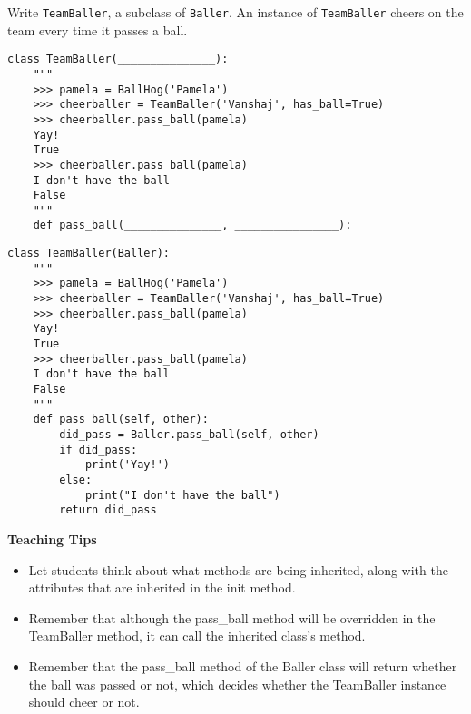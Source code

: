 \begin{blocksection}
\question Write \lstinline$TeamBaller$, a subclass of \lstinline$Baller$. An instance of \lstinline$TeamBaller$ cheers on the team every time it passes a ball.

\ifprintanswers\else
\begin{lstlisting}
class TeamBaller(_______________):
    """
    >>> pamela = BallHog('Pamela')
    >>> cheerballer = TeamBaller('Vanshaj', has_ball=True)
    >>> cheerballer.pass_ball(pamela)
    Yay!
    True
    >>> cheerballer.pass_ball(pamela)
    I don't have the ball
    False
    """
    def pass_ball(_______________, ________________):
\end{lstlisting}
\fi

\begin{solution}[1in]
\begin{lstlisting}
class TeamBaller(Baller):
    """
    >>> pamela = BallHog('Pamela')
    >>> cheerballer = TeamBaller('Vanshaj', has_ball=True)
    >>> cheerballer.pass_ball(pamela)
    Yay!
    True
    >>> cheerballer.pass_ball(pamela)
    I don't have the ball
    False
    """
    def pass_ball(self, other):
        did_pass = Baller.pass_ball(self, other)
        if did_pass:
            print('Yay!')
        else:
            print("I don't have the ball")
        return did_pass
\end{lstlisting}
\end{solution}

\begin{guide}
\begin{blocksection}
\textbf{Teaching Tips}
    \begin{itemize}
    \item Let students think about what methods are being inherited, along with the attributes that are inherited in the init method.
    \item Remember that although the pass\_ball method will be overridden in the TeamBaller method, it can call the inherited class's method.
    \item Remember that the pass\_ball method of the Baller class will return whether the ball was passed or not, which decides whether the TeamBaller instance should cheer or not.
    \end{itemize}
\end{blocksection}
\end{guide}

\end{blocksection}